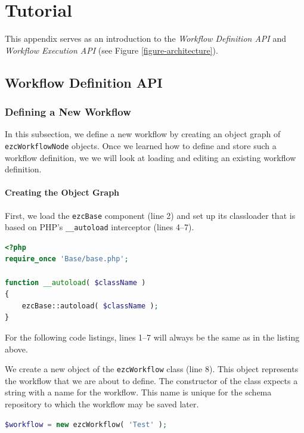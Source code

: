 \chapter{Tutorial}
\label{chapter-Tutorial}

This appendix serves as an introduction to the \emph{Workflow Definition API}
and \emph{Workflow Execution API} (see Figure \ref{figure-architecture}).

\section{Workflow Definition API}

\subsection{Defining a New Workflow}

In this subsection, we define a new workflow by creating an object graph of
\texttt{ezcWorkflowNode} objects. Once we learned how to define and store such
a workflow definition, we we will look at loading and editing an existing
workflow definition.

\subsubsection{Creating the Object Graph}

First, we load the \texttt{ezcBase} component (line 2) and set up its
classloader that is based on PHP's \texttt{\_\_autoload} interceptor
(lines 4--7).

\begin{lstlisting}[language=PHP,firstnumber=1]
<?php
require_once 'Base/base.php';

function __autoload( $className )
{
    ezcBase::autoload( $className );
}
\end{lstlisting}

For the following code listings, lines 1--7 will always be the same as in the
listing above.

We create a new object of the \texttt{ezcWorkflow} class (line 8). This object
represents the workflow that we are about to define. The constructor of the
class expects a string with a name for the workflow. This name is unique for
the schema repository to which the workflow may be saved later.

\begin{lstlisting}[language=PHP,firstnumber=8]
$workflow = new ezcWorkflow( 'Test' );
\end{lstlisting}

